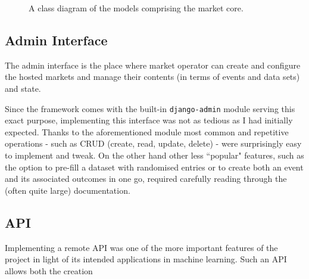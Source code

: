 \documentclass[bsc,frontabs,twoside,singlespacing,parskip,deptreport]{infthesis}     %
\begin{document}
\begin{figure}
\noindent{}
\label{fig:class_diagram}
\caption{A class diagram of the models comprising the market core. }
\end{figure}


\subsection{Admin Interface}
    The admin interface is the place where market operator can create and configure the hosted markets and manage their contents (in terms of events and data sets) and state. 

	Since the framework comes with the built-in {\tt django-admin} module serving this exact purpose, implementing this interface was not as tedious as I had initially expected. Thanks to the aforementioned module most common and repetitive operations - such as CRUD (create, read, update, delete) - were surprisingly easy to implement and tweak. On the other hand other less ``popular" features, such as the option to pre-fill a dataset with randomised entries or to create both an event and its associated outcomes in one go, required carefully reading through the (often quite large) documentation.   

\subsection{API}
	Implementing a remote API was one of the more important features of the project in light of its intended applications in machine learning. Such an API allows both the creation 
\end{document}
